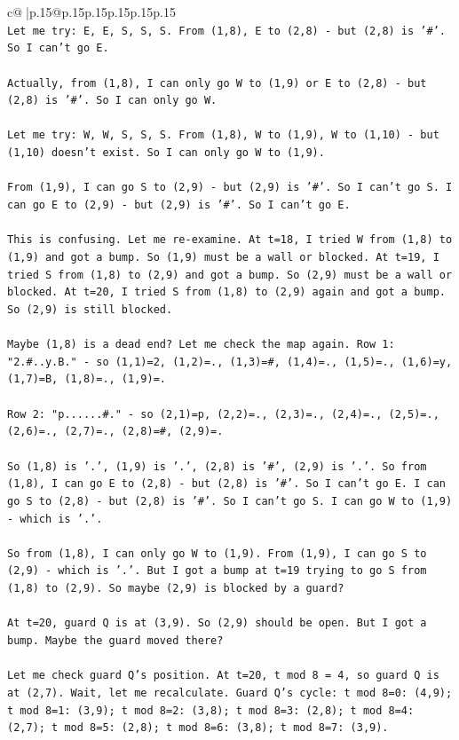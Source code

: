 \documentclass{article}
\begin{document}
{\begin{supertabular}{c@{$\;$}|p{.15\linewidth}@{}p{.15\linewidth}p{.15\linewidth}p{.15\linewidth}p{.15\linewidth}p{.15\linewidth}}
{{{\\ 
\texttt{Let me try: E, E, S, S, S. From (1,8), E to (2,8) {-} but (2,8) is '\#'. So I can't go E.} \\
\\ 
\texttt{Actually, from (1,8), I can only go W to (1,9) or E to (2,8) {-} but (2,8) is '\#'. So I can only go W.} \\
\\ 
\texttt{Let me try: W, W, S, S, S. From (1,8), W to (1,9), W to (1,10) {-} but (1,10) doesn't exist. So I can only go W to (1,9).} \\
\\ 
\texttt{From (1,9), I can go S to (2,9) {-} but (2,9) is '\#'. So I can't go S. I can go E to (2,9) {-} but (2,9) is '\#'. So I can't go E.} \\
\\ 
\texttt{This is confusing. Let me re{-}examine. At t=18, I tried W from (1,8) to (1,9) and got a bump. So (1,9) must be a wall or blocked. At t=19, I tried S from (1,8) to (2,9) and got a bump. So (2,9) must be a wall or blocked. At t=20, I tried S from (1,8) to (2,9) again and got a bump. So (2,9) is still blocked.} \\
\\ 
\texttt{Maybe (1,8) is a dead end? Let me check the map again. Row 1: "2.\#..y.B." {-} so (1,1)=2, (1,2)=., (1,3)=\#, (1,4)=., (1,5)=., (1,6)=y, (1,7)=B, (1,8)=., (1,9)=.} \\
\\ 
\texttt{Row 2: "p......\#." {-} so (2,1)=p, (2,2)=., (2,3)=., (2,4)=., (2,5)=., (2,6)=., (2,7)=., (2,8)=\#, (2,9)=.} \\
\\ 
\texttt{So (1,8) is '.', (1,9) is '.', (2,8) is '\#', (2,9) is '.'. So from (1,8), I can go E to (2,8) {-} but (2,8) is '\#'. So I can't go E. I can go S to (2,8) {-} but (2,8) is '\#'. So I can't go S. I can go W to (1,9) {-} which is '.'.} \\
\\ 
\texttt{So from (1,8), I can only go W to (1,9). From (1,9), I can go S to (2,9) {-} which is '.'. But I got a bump at t=19 trying to go S from (1,8) to (2,9). So maybe (2,9) is blocked by a guard?} \\
\\ 
\texttt{At t=20, guard Q is at (3,9). So (2,9) should be open. But I got a bump. Maybe the guard moved there?} \\
\\ 
\texttt{Let me check guard Q's position. At t=20, t mod 8 = 4, so guard Q is at (2,7). Wait, let me recalculate. Guard Q's cycle: t mod 8=0: (4,9); t mod 8=1: (3,9); t mod 8=2: (3,8); t mod 8=3: (2,8); t mod 8=4: (2,7); t mod 8=5: (2,8); t mod 8=6: (3,8); t mod 8=7: (3,9).} \\
}}}
\end{supertabular}}
\end{document}
